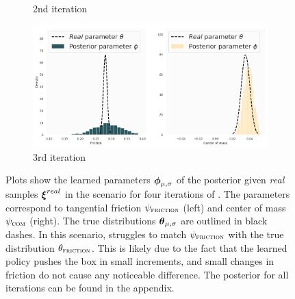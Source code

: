 \begin{figure}
\begin{subfigure}{0.45\textwidth}
  \caption{2nd iteration}
\end{subfigure}
\begin{subfigure}{0.45\textwidth}
  \centering
  \includegraphics[width=\linewidth]{img/yumi/latent-representation/latent_encodings_iter4.png}
  \caption{3rd iteration}
\end{subfigure}
\caption{Plots show the learned parameters $\boldsymbol{\phi}_{\mu, \sigma}$ of the posterior given \emph{real} samples $\boldsymbol{\xi}^{real}$ in the \yp{} scenario for four iterations of \dettostoc{}.
The parameters correspond to tangential friction $\psi_{\textsc{friction}}$ (left) and center of mass $\psi_{\textsc{com}}$ (right). The true distributions $\boldsymbol{\theta}_{\mu, \sigma}$ are outlined in black dashes. In this scenario, \dettostoc{} struggles to match $\psi_{\textsc{friction}}{}$ with the true distribution $\theta_\textsc{friction}$. This is likely due to the fact that the learned policy pushes the box in small increments, and small changes in friction do not cause any noticeable difference. The posterior for all iterations can be found in the appendix.}
\label{fig:yumi_latent_space_full}
\end{figure}